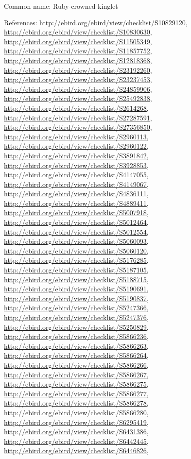 \documentclass[9pt, article]{memoir}
\begin{document}
\begin{multicols}{2}
Common name: Ruby-crowned kinglet

References: 
\url{http://ebird.org/ebird/view/checklist/S10829120}, 
\url{http://ebird.org/ebird/view/checklist/S10830630}, 
\url{http://ebird.org/ebird/view/checklist/S11505349}, 
\url{http://ebird.org/ebird/view/checklist/S11857752}, 
\url{http://ebird.org/ebird/view/checklist/S12818368}, 
\url{http://ebird.org/ebird/view/checklist/S23192260}, 
\url{http://ebird.org/ebird/view/checklist/S23237453}, 
\url{http://ebird.org/ebird/view/checklist/S24859906}, 
\url{http://ebird.org/ebird/view/checklist/S25492838}, 
\url{http://ebird.org/ebird/view/checklist/S2614268}, 
\url{http://ebird.org/ebird/view/checklist/S27287591}, 
\url{http://ebird.org/ebird/view/checklist/S27356850}, 
\url{http://ebird.org/ebird/view/checklist/S2960113}, 
\url{http://ebird.org/ebird/view/checklist/S2960122}, 
\url{http://ebird.org/ebird/view/checklist/S3891842}, 
\url{http://ebird.org/ebird/view/checklist/S3928853}, 
\url{http://ebird.org/ebird/view/checklist/S4147055}, 
\url{http://ebird.org/ebird/view/checklist/S4149067}, 
\url{http://ebird.org/ebird/view/checklist/S4836111}, 
\url{http://ebird.org/ebird/view/checklist/S4889411}, 
\url{http://ebird.org/ebird/view/checklist/S5007918}, 
\url{http://ebird.org/ebird/view/checklist/S5012464}, 
\url{http://ebird.org/ebird/view/checklist/S5012554}, 
\url{http://ebird.org/ebird/view/checklist/S5060093}, 
\url{http://ebird.org/ebird/view/checklist/S5060120}, 
\url{http://ebird.org/ebird/view/checklist/S5176285}, 
\url{http://ebird.org/ebird/view/checklist/S5187105}, 
\url{http://ebird.org/ebird/view/checklist/S5188715}, 
\url{http://ebird.org/ebird/view/checklist/S5190691}, 
\url{http://ebird.org/ebird/view/checklist/S5190837}, 
\url{http://ebird.org/ebird/view/checklist/S5247366}, 
\url{http://ebird.org/ebird/view/checklist/S5247376}, 
\url{http://ebird.org/ebird/view/checklist/S5250829}, 
\url{http://ebird.org/ebird/view/checklist/S5866236}, 
\url{http://ebird.org/ebird/view/checklist/S5866263}, 
\url{http://ebird.org/ebird/view/checklist/S5866264}, 
\url{http://ebird.org/ebird/view/checklist/S5866266}, 
\url{http://ebird.org/ebird/view/checklist/S5866267}, 
\url{http://ebird.org/ebird/view/checklist/S5866275}, 
\url{http://ebird.org/ebird/view/checklist/S5866277}, 
\url{http://ebird.org/ebird/view/checklist/S5866278}, 
\url{http://ebird.org/ebird/view/checklist/S5866280}, 
\url{http://ebird.org/ebird/view/checklist/S6295419}, 
\url{http://ebird.org/ebird/view/checklist/S6431386}, 
\url{http://ebird.org/ebird/view/checklist/S6442445}, 
\url{http://ebird.org/ebird/view/checklist/S6446826}, 

\end{multicols}
\end{document}

